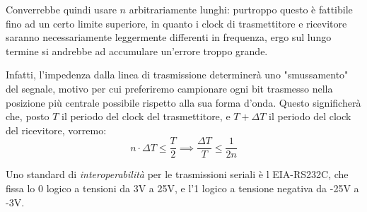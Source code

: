 \documentclass[a4paper,11pt]{article}
\begin{document}
Converrebbe quindi usare $n$ arbitrariamente lunghi: purtroppo questo è fattibile fino ad un certo limite superiore, in quanto i clock di trasmettitore e ricevitore saranno necessariamente leggermente differenti in frequenza, ergo sul lungo termine si andrebbe ad accumulare un'errore troppo grande.

Infatti, l'impedenza dalla linea di trasmissione determinerà uno "smussamento" del segnale, motivo per cui preferiremo campionare ogni bit trasmesso nella posizione più centrale possibile rispetto alla sua forma d'onda.
Questo significherà che, posto $T$ il periodo del clock del trasmettitore, e $T + \Delta T$ il periodo del clock del ricevitore, vorremo:
$$
n \cdot \Delta T \leq \frac{T}{2} \implies \frac{\Delta T}{T} \leq \frac{1}{2n}
$$

Uno standard di \textit{interoperabilità} per le trasmissioni seriali è l EIA-RS232C, che fissa lo 0 logico a tensioni da 3V a 25V, e l'1 logico a tensione negativa da -25V a -3V.
\end{document}
